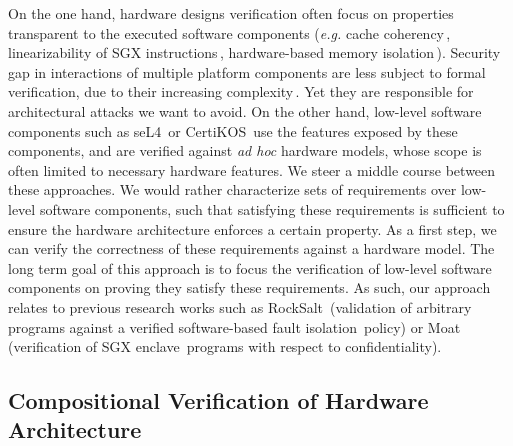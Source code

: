 \documentclass[oneside,a4paper]{memoir}
\theoremstyle{break}
\begin{document}
On the one hand, hardware designs verification often focus on properties
transparent to the executed software components (\emph{e.g.} cache
coherency\,\cite{stern1995cachecoherence}, linearizability of SGX
instructions\,\cite{leslie2015sgx}, hardware-based memory
isolation\,\cite{lie2003xom}).
%
Security gap in interactions of multiple platform components are less subject to
formal verification, due to their increasing
complexity\,\cite{potlapally2011hardwaresecurity}.
%
Yet they are responsible for architectural attacks we want to avoid.
%
On the other hand, low-level software components such as
seL4\,\cite{klein2009sel4} or CertiKOS\,\cite{gu2016certikos} use the features
exposed by these components, and are verified against \emph{ad hoc} hardware
models, whose scope is often limited to necessary hardware features.
%
We steer a middle course between these approaches.
%
We would rather characterize sets of requirements over low-level software
components, such that satisfying these requirements is sufficient to ensure the
hardware architecture enforces a certain property.
%
As a first step, we can verify the correctness of these requirements against a
hardware model.
%
The long term goal of this approach is to focus the verification of low-level
software components on proving they satisfy these requirements.
%
As such, our approach relates to previous research works such as
RockSalt\,\cite{morrisett2012rocksalt} (validation of arbitrary programs against
a verified software-based fault isolation\,\cite{wahbe1994sfi} policy) or
Moat\,\cite{sinha2015moat} (verification of SGX
enclave\,\cite{costan2016sgxexplained} programs with respect to
confidentiality).

\subsection{Compositional Verification of Hardware Architecture}

%

\end{document}
